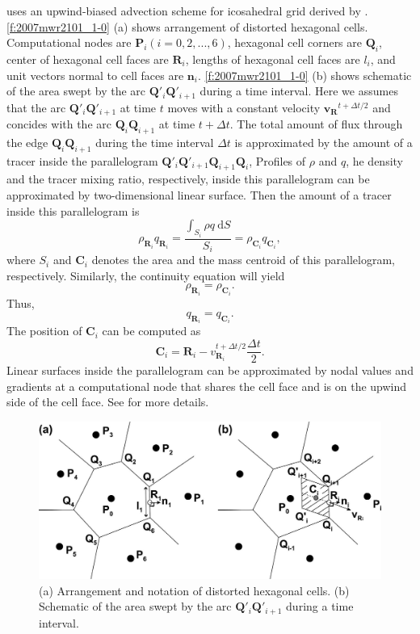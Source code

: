 \NICAM uses an upwind-biased advection scheme for icosahedral grid
derived by \cite{Miura:2007bs}.
%
\autoref{f:2007mwr2101_1-0} (a) shows arrangement of distorted hexagonal
cells. Computational nodes are $\bm{P}_i(i=0,2,...,6)$, hexagonal cell
corners are $\bm{Q}_i$, center of hexagonal cell faces are $\bm{R}_i$,
lengths of hexagonal cell faces are $l_i$, and unit vectors normal to
cell faces are $\bm{n}_i$.
%
\autoref{f:2007mwr2101_1-0} (b) shows schematic of the area swept by the
arc $\bm{Q}'_i\bm{Q}'_{i+1}$ during a time interval.
%
Here we assumes that the arc $\bm{Q}'_i\bm{Q}'_{i+1}$ at time $t$
moves with a constant velocity $\bm{v_R}^{t+\Delta t/2}$
and concides with the arc $\bm{Q}_i\bm{Q}_{i+1}$ at time $t+\Delta t$.
%
The total amount of flux through the edge $\bm{Q}_i\bm{Q}_{i+1}$
during the time interval $\Delta t$ is approximated by the amount of a
tracer inside the parallelogram
$\bm{Q}'_i\bm{Q}'_{i+1}\bm{Q}_{i+1}\bm{Q}_i$,
%
Profiles of $\rho$ and $q$, he density and the
tracer mixing ratio, respectively, inside this parallelogram can be
approximated by two-dimensional linear surface.
%
Then the amount of a tracer inside this parallelogram is
%
\begin{equation}
\rho_{\bm{R}_i} q_{\bm{R}_i}
 = \frac{\int_{S_i} \rho q \ \mathrm{d}S}
         {S_i}
 = \rho_{\bm{C}_i} q_{\bm{C}_i},
\end{equation}
%
where $S_i$ and
$\bm{C}_i$ denotes the area and the mass centroid of this parallelogram, respectively.
%
Similarly, the continuity equation will yield
%
\begin{equation}
 \rho_{\bm{R}_i} = \rho_{\bm{C}_i}.
\end{equation}
%
Thus,
%
\begin{equation}
 q_{\bm{R}_i} = q_{\bm{C}_i}.
\end{equation}
%
The position of $\bm{C}_i$ can be computed as
%
\begin{equation}
\bm{C}_i = \bm{R}_i - v_{\bm{R}_i}^{t+\Delta t/2} \frac{\Delta t}{2}.
\end{equation}
%
Linear surfaces inside the parallelogram can be approximated by nodal
values and gradients at a computational node that shares the cell face
and is on the upwind side of the cell face.
%
See \cite{Miura:2007bs} for more details.

\begin{figure}[htbp]
\centering
\includegraphics[scale=.3]{figs/2007mwr2101_1-0.png}
 \caption{%
(a) Arrangement and notation of distorted hexagonal cells.%
(b) Schematic of the area swept by the arc $\bm{Q}'_i \bm{Q}'_{i+1}$ during a time interval.%
}\label{f:2007mwr2101_1-0}
\end{figure}


